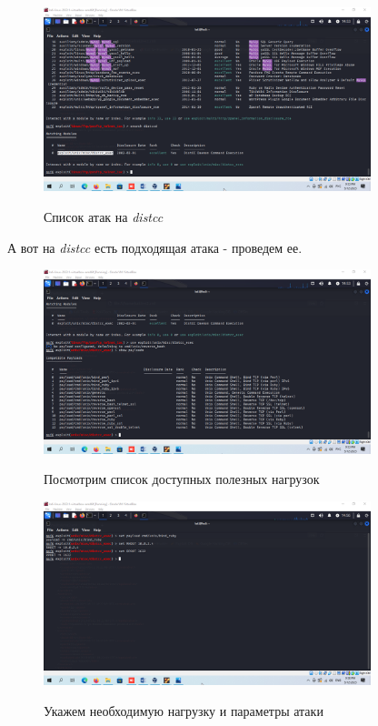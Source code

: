 \documentclass[a4paper]{article}
\begin{document}
  \begin{figure}[H]
    \centering
    \includegraphics[width=0.85\textwidth]{04_0087}
    \label{img:86}
    \caption{Список атак на \textit{distcc}}
  \end{figure}

  А вот на \textit{distcc} есть подходящая атака - проведем ее.

  \begin{figure}[H]
    \centering
    \includegraphics[width=0.85\textwidth]{04_0088}
    \label{img:87}
    \caption{Посмотрим список доступных полезных нагрузок}
  \end{figure}

  \begin{figure}[H]
    \centering
    \includegraphics[width=0.85\textwidth]{04_0093}
    \label{img:93}
    \caption{Укажем  необходимую нагрузку и параметры атаки}
  \end{figure}
\end{document}
